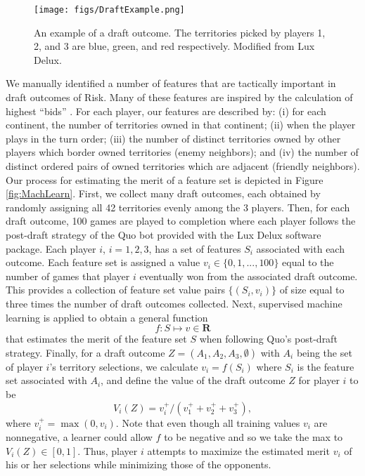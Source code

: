 \documentclass[letterpaper]{article}
\numberwithin{equation}{section}
\numberwithin{theorem}{section}
\numberwithin{lemma}{section}
\numberwithin{df}{section}
\begin{document}
\begin{figure}[t]
	\centering
	\texttt{[image: figs/DraftExample.png]}
	\caption{An example of a draft outcome.  The territories picked by players 1, 2, and 3 are blue, green, and red respectively.  %
	Modified from Lux Delux.}
	\label{fig:DraftExample}
\end{figure}

We manually identified a number of features that are tactically important in draft outcomes of Risk.  Many of these features are inspired by the calculation of highest ``bids'' \cite{RiskBots}.  For each player, our features are described by: (i) for each continent, the number of territories owned in that continent; (ii) when the player plays in the turn order; (iii) the number of distinct territories owned by other players which border owned territories (enemy neighbors); and (iv) the number of distinct ordered pairs of owned territories which are adjacent (friendly neighbors).  Our process for estimating the merit of a feature set is depicted in Figure \ref{fig:MachLearn}.  First, we collect many draft outcomes, each obtained by randomly assigning all 42 territories evenly among the 3 players.  Then, for each draft outcome, 100 games are played to completion where each player follows the post-draft strategy of the Quo bot provided with the Lux Delux software package.  Each player $i$, $i=1,2,3$, has a set of features $S_i$ associated with each outcome.  Each feature set is assigned a value $v_i \in \{0,1,...,100\}$ equal to the number of games that player $i$ eventually won from the associated draft outcome.  This provides a collection of feature set value pairs $\{(S_i, v_i)\}$ of size equal to three times the number of draft outcomes collected.  Next, supervised machine learning is applied to obtain a general function
\[ f: S \mapsto v \in \textbf{R} \] 
that estimates the merit of the feature set $S$ when following Quo's post-draft strategy.  Finally, for a draft outcome $Z = (A_1,A_2,A_3,\emptyset)$ with $A_i$ being the set of player $i$'s territory selections, we calculate $v_i = f(S_i)$ where $S_i$ is the feature set associated with $A_i$, and define the value of the draft outcome $Z$ for player $i$ to be
\[ V_i(Z) = v_i^+ / \left(v_1^+ + v_2^+ + v_3^+\right), \]
where $v_i^+ = \max(0, v_i)$.  Note that even though all training values $v_i$ are nonnegative, a learner could allow $f$ to be negative and so we take the max to $V_i(Z) \in [0,1]$.  
Thus, player $i$ attempts to maximize the estimated merit $v_i$ of his or her selections while minimizing those of the opponents.
\end{document}
